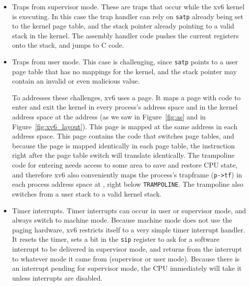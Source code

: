 \begin{itemize}

\item Traps from supervisor mode. These are traps that occur while the
  xv6 kernel is executing. In this case the trap handler can rely on
  {\tt satp} already being set to the kernel page table, and the stack
  pointer already pointing to a valid stack in the kernel. The
  assembly handler code pushes the current registers onto the
  stack, and jumps to C code.

\item Traps from user mode. This case is challenging, since {\tt satp}
  points to a user page table that has no mappings for the kernel, and
  the stack pointer may contain an invalid or even malicious value.

  To addresses these challenges, xv6 uses a 
  page.  It maps a page with code to enter and exit the kernel in
  every process's address space and in the kernel address space at the
  address  (as we saw in Figure~\ref{fig:as} and
  in Figure~\ref{fig:xv6_layout}).  This page is mapped at the same
  address in each address space.  This page contains the code that
  switches page tables, and because the page is mapped identically in
  each page table, the instruction right after the page table switch
  will translate identically.  The trampoline code for entering needs
  access to some area to save and restore CPU state, and therefore xv6
  also conveniently maps the process's trapframe (\lstinline{p->tf})
  in each process address space at , right below
  \lstinline{TRAMPOLINE}.  The trampoline also switches from a user
  stack to a valid kernel stack.
  
\item Timer interrupts.  Timer interrupts can occur in user
  or supervisor mode, and always switch to machine mode.
  Because machine mode does not use the paging hardware,
  xv6 restricts itself to a very simple timer interrupt handler.
  It resets the
  timer, sets a bit in the \lstinline{sip} register to ask
  for a software interrupt to be delivered in supervisor mode,
  and returns from the
  interrupt to whatever mode it came from (supervisor or user mode).
  Because there is an interrupt pending for supervisor mode, the
  CPU immediately will take it unless interrupts are disabled.

\end{itemize}

